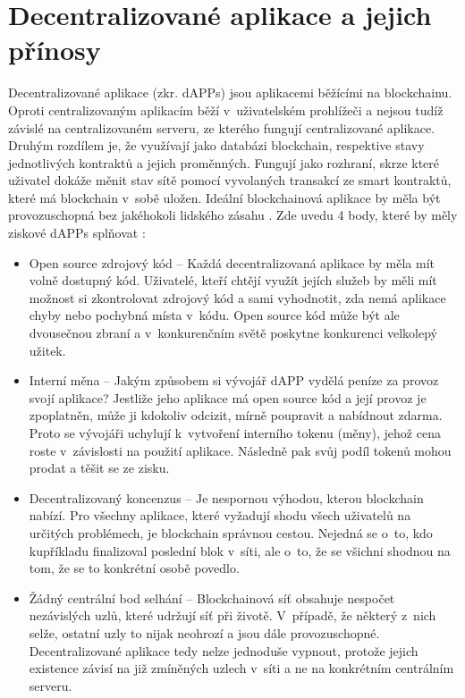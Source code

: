 \section{Decentralizované aplikace a jejich přínosy}
Decentralizované aplikace (zkr. dAPPs) jsou aplikacemi běžícími na blockchainu. Oproti centralizovaným aplikacím běží v~uživatelském prohlížeči a nejsou tudíž závislé na centralizovaném serveru, ze kterého fungují centralizované aplikace. Druhým rozdílem je, že využívají jako databázi blockchain, respektive stavy jednotlivých kontraktů a jejich proměnných. Fungují jako rozhraní, skrze které uživatel dokáže měnit stav sítě pomocí vyvolaných transakcí ze smart kontraktů, které má blockchain v~sobě uložen. Ideální blockchainová aplikace by měla být provozuschopná bez jakéhokoli lidského zásahu \cite{dapps}. Zde uvedu 4 body, které by měly ziskové dAPPs splňovat \cite{Raval2016}: 
\begin{itemize}
\item Open source zdrojový kód -- Každá decentralizovaná aplikace by měla mít volně dostupný kód. Uživatelé, kteří chtějí využít jejích služeb by měli mít možnost si zkontrolovat zdrojový kód a sami vyhodnotit, zda nemá aplikace chyby nebo pochybná místa v~kódu. Open source kód může být ale dvousečnou zbraní a v~konkurenčním světě poskytne konkurenci velkolepý užitek.
\item Interní měna -- Jakým způsobem si vývojář dAPP vydělá peníze za provoz svojí aplikace? Jestliže jeho aplikace má open source kód a její provoz je zpoplatněn, může ji kdokoliv odcizit, mírně poupravit a nabídnout zdarma. Proto se vývojáři uchylují k~vytvoření interního tokenu (měny), jehož cena roste v~závislosti na použití aplikace. Následně pak svůj podíl tokenů mohou prodat a těšit se ze zisku.
\item Decentralizovaný koncenzus -- Je nespornou výhodou, kterou blockchain nabízí. Pro všechny aplikace, které vyžadují shodu všech uživatelů na určitých problémech, je blockchain správnou cestou. Nejedná se o~to, kdo kupříkladu finalizoval poslední blok v~síti, ale o~to, že se všichni shodnou na tom, že se to konkrétní osobě povedlo.
\item Žádný centrální bod selhání -- Blockchainová síť obsahuje nespočet nezávislých uzlů, které udržují síť při životě. V~případě, že některý z~nich selže, ostatní uzly to nijak neohrozí a jsou dále provozuschopné. Decentralizované aplikace tedy nelze jednoduše vypnout, protože jejich existence závisí na již zmíněných uzlech v~síti a ne na konkrétním centrálním serveru.
\end{itemize}

